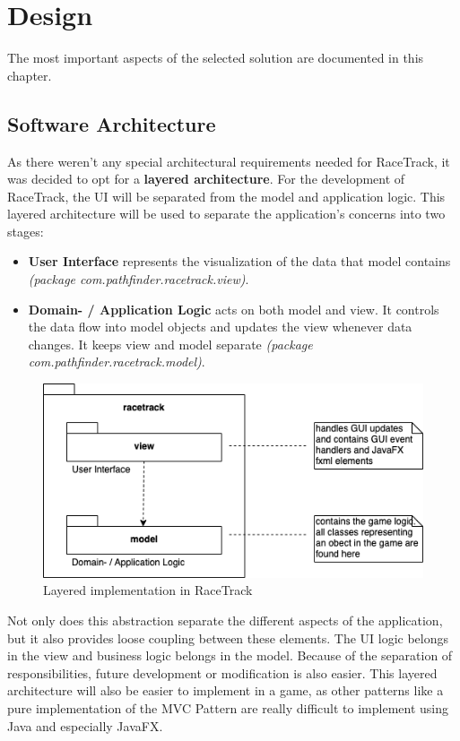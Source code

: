\chapter{Design}
	The most important aspects of the selected solution are documented in this chapter.

	\section{Software Architecture}
		As there weren't any special architectural requirements needed for RaceTrack, it was decided to opt for a \textbf{layered architecture}. For the development of RaceTrack, the UI will be separated from the model and application logic. This layered architecture will be used to separate the application's concerns into two stages:
		\begin{itemize}
			\item \textbf{User Interface} represents the visualization of the data that model contains \textit{(package com.pathfinder.racetrack.view)}.
			\item \textbf{Domain- / Application Logic} acts on both model and view. It controls the data flow into model objects and updates the view whenever data changes. It keeps view and model separate \textit{(package com.pathfinder.racetrack.model)}.
		\end{itemize}
		\begin{figure}[H]
			\centering
			\includegraphics[width=12cm,keepaspectratio,center]{img/Software-Architecture_MVC-Custom.png}
			\caption{Layered implementation in RaceTrack}
		\end{figure}
		Not only does this abstraction separate the different aspects of the application, but it also provides loose coupling between these elements. The UI logic belongs in the view and business logic belongs in the model. Because of the separation of responsibilities, future development or modification is also easier. This layered architecture will also be easier to implement in a game, as other patterns like a pure implementation of the MVC Pattern are really difficult to implement using Java and especially JavaFX. \\~\\
		

